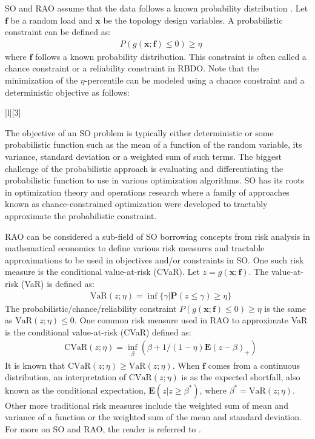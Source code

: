 SO and RAO assume that the data follows a known probability distribution \citep{Shapiro2009,Choi2007}. Let $\bm{f}$ be a random load and $\bm{x}$ be the topology design variables. A probabilistic constraint can be defined as:
\begin{align}
  & P(g(\bm{x}; \bm{f}) \leq 0) \geq \eta 
\end{align}
where $\bm{f}$ follows a known probability distribution. This constraint is often called a chance constraint or a reliability constraint in RBDO. Note that the minimization of the $\eta$-percentile can be modeled using a chance constraint and a deterministic objective as follows:
\begin{mini!}|l|[3]
  {}{\gamma}{}{}
\end{mini!}
The objective of an SO problem is typically either deterministic or some probabilistic function such as the mean of a function of the random variable, its variance, standard deviation or a weighted sum of such terms. The biggest challenge of the probabilistic approach is evaluating and differentiating the probabilistic function to use in various optimization algorithms. SO has its roots in optimization theory and operations research where a family of approaches known as chance-constrained optimization were developed to tractably approximate the probabilistic constraint.

RAO can be considered a sub-field of SO borrowing concepts from risk analysis in mathematical economics to define various risk measures and tractable approximations to be used in objectives and/or constraints in SO. One such risk measure is the conditional value-at-risk (CVaR). Let $z = g(\bm{x}; \bm{f})$. The value-at-risk (VaR) is defined as:
\begin{align}
 & \bm{\mathrm{VaR}}(z; \eta) = \inf\{\gamma | \bm{P}(z \leq \gamma) \geq \eta\}
\end{align}
The probabilistic/chance/reliability constraint $P(g(\bm{x}; \bm{f}) \leq 0) \geq \eta$ is the same as $\bm{\mathrm{VaR}}(z; \eta) \leq 0$. One common risk measure used in RAO to approximate VaR is the conditional value-at-risk (CVaR) defined as: 
\begin{align}
 & \bm{\mathrm{CVaR}}(z; \eta) = \inf_{\beta}(\beta + 1/(1-\eta) \bm{E}(z - \beta)_+)
\end{align}
It is known that $\bm{\mathrm{CVaR}}(z;\eta) \geq \bm{\mathrm{VaR}}(z;\eta)$. When $\bm{f}$ comes from a continuous distribution, an interpretation of $\bm{\mathrm{CVaR}}(z;\eta)$ is as the expected shortfall, also known as the conditional expectation, $\bm{E}(z|z \geq \beta^*)$, where $\beta^* = \bm{\mathrm{VaR}}(z;\eta)$. Other more traditional risk measures include the weighted sum of mean and variance of a function or the weighted sum of the mean and standard deviation. For more on SO and RAO, the reader is referred to \cite{Shapiro2009}. 


